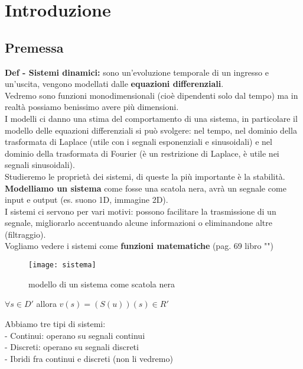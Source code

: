 \chapter{Introduzione}
\section{ Premessa }

\textbf{Def - Sistemi dinamici:}  sono un'evoluzione temporale di un ingresso e un'uscita, vengono modellati dalle \textbf{equazioni differenziali}.\\
Vedremo sono funzioni monodimensionali (cioè dipendenti solo dal tempo) ma in realtà possiamo benissimo avere più dimensioni.\\
I modelli ci danno una stima del comportamento di una sistema, in particolare il modello delle equazioni differenziali si può svolgere: nel tempo, nel dominio della trasformata di Laplace (utile con i segnali esponenziali e sinusoidali) e nel dominio della trasformata di Fourier (è un restrizione di Laplace, è utile nei segnali sinusoidali).\\
Studieremo le proprietà dei sistemi, di queste la più importante è la stabilità.\\
\textbf{Modelliamo un sistema} come fosse una scatola nera, avrà un segnale come input e output (es. suono 1D, immagine 2D).\\
I sistemi ci servono per vari motivi: possono facilitare la trasmissione di un segnale, migliorarlo accentuando alcune informazioni o eliminandone altre (filtraggio).\\
Vogliamo vedere i sistemi come \textbf{funzioni matematiche} (pag. 69 libro "")\\

\begin{figure}
	\centering
	\texttt{[image: sistema]}
	\caption{ modello di un sistema come scatola nera}
	\label{fig:sistema}
\end{figure}



$ \forall s \in D' $ allora $ v(s)=(S(u))(s)\in R'  $ \\

\pagebreak

Abbiamo tre tipi di sistemi:\\
- Continui: operano su segnali continui\\
- Discreti: operano su segnali discreti\\
- Ibridi fra continui e discreti (non li vedremo)\\

